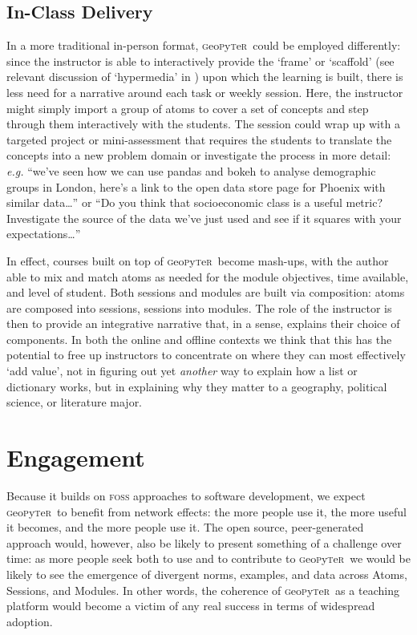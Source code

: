 \documentclass[letter, 11pt,titlepage]{article}
\newcommand{\gp}{\textsc{g}eo\textsc{p}y\textsc{t}e\textsc{r}~\/}
\begin{document}
\subsection{In-Class Delivery}\label{in-class-delivery}

In a more traditional in-person format, \gp could be employed differently: since
the instructor is able to interactively provide the `frame' or `scaffold' (see
relevant discussion of `hypermedia' in \citealp{Azevedo2008}) upon which the
learning is built, there is less need for a narrative around each task or weekly
session. Here, the instructor might simply import a group of atoms to cover a
set of concepts and step through them interactively with the students. The
session could wrap up with a targeted project or mini-assessment that requires
the students to translate the concepts into a new problem domain or investigate
the process in more detail: \emph{e.g.} ``we've seen how we can use pandas and
bokeh to analyse demographic groups in London, here's a link to the open data
store page for Phoenix with similar data\ldots{}'' or ``Do you think that
socioeconomic class is a useful metric? Investigate the source of the data we've
just used and see if it squares with your expectations\ldots{}''

In effect, courses built on top of \gp become mash-ups, with the author able to
mix and match atoms as needed for the module objectives, time available, and
level of student. Both sessions and modules are built via composition: atoms are
composed into sessions, sessions into modules. The role of the instructor is
then to provide an integrative narrative that, in a sense, explains their choice
of components. In both the online and offline contexts we think that this has
the potential to free up instructors to concentrate on where they can most
effectively `add value', not in figuring out yet \emph{another} way to explain
how a list or dictionary works, but in explaining why they matter to a
geography, political science, or literature major.

\section{Engagement}\label{engagement}

Because it builds on \textsc{foss} approaches to software development, we expect \gp to benefit from network effects: the more people use it, the more useful it becomes, and the more people use it. The open source, peer-generated approach would, however, also be likely to present something of a challenge over time: as more people seek both to use and to contribute to \gp we would be likely to see the emergence of divergent norms, examples, and data across Atoms, Sessions, and Modules. In other words, the coherence of \gp as a teaching platform would become a victim of any real success in terms of widespread adoption.
\end{document}

